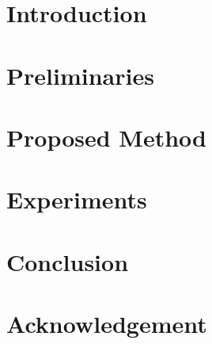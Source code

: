 \documentclass[10pt]{jarticle}
\begin{document}
\maketitle



\section{Introduction}\label{sec:Introduction}


\section{Preliminaries}\label{sec:Preliminaries}


\section{Proposed Method}\label{sec:ProposedMethod}



\section{Experiments}\label{sec:Experiments}


\section{Conclusion}\label{sec:Conclusion}



\section*{Acknowledgement}\label{sec:Acknowledgement}


\begin{spacing}{1}
    
    \small
    
\end{spacing}
\end{document}
